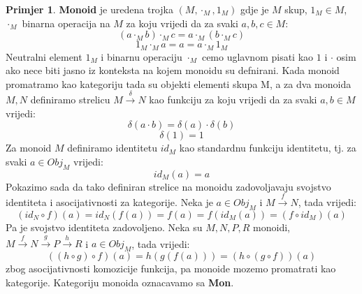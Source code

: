 \documentclass[11pt]{article}
\newcommand{\bold}[1]{\textbf{#1}}
\theoremstyle{definition}
\newtheorem{primjer}{Primjer}
\begin{document}
  \begin{primjer}
    \bold{Monoid} je uredena trojka $(M, \cdot_M, 1_M)$ gdje je $M$ skup, $1_M
    \in M$, $\cdot_M$ binarna operacija na $M$ za koju vrijedi da za svaki $a, b, c \in M$:
    \begin{equation*}
      (a \cdot_M b) \cdot_M c = a \cdot_M (b \cdot_M c)
    \end{equation*}
    \begin{equation*}
      1_M \cdot_M a = a = a \cdot_M 1_M
    \end{equation*}
    Neutralni element $1_M$ i binarnu operaciju $\cdot_M$ cemo uglavnom pisati
    kao $1$ i $\cdot$ osim ako nece biti jasno iz konteksta na kojem monoidu
    su defnirani.
    Kada monoid promatramo kao kategoriju tada su objekti elementi skupa M, a
    za dva monoida $M, N$ definiramo strelicu $M \xrightarrow{\delta} N$ kao
    funkciju za koju vrijedi da za svaki $a, b \in M$ vrijedi:
    \begin{equation*}
      \delta(a \cdot b) = \delta(a) \cdot \delta(b)
    \end{equation*}
    \begin{equation*}
      \delta(1) = 1
    \end{equation*}
    Za monoid $M$ definiramo identitetu $id_M$ kao standardnu funkciju
    identitetu, tj. za svaki $a \in Obj_M$ vrijedi:
    \begin{equation*}
      id_M(a) = a
    \end{equation*}
    Pokazimo sada da tako definiran strelice na monoidu zadovoljavaju
    svojstvo identiteta i asocijativnosti za kategorije.
    Neka je $a \in Obj_M$ i $M \xrightarrow{f} N$, tada vrijedi:
    \begin{equation*}
      (id_N \circ f)(a) = id_N(f(a)) = f(a) = f(id_M(a)) = (f \circ id_M)(a)
    \end{equation*}
    Pa je svojstvo identiteta zadovoljeno.
    Neka su $M, N, P, R$ monoidi, $M \xrightarrow{f} N \xrightarrow{g} P \xrightarrow{h} R$
    i $a \in Obj_M$, tada vrijedi:
    \begin{equation*}
      ((h \circ g) \circ f)(a) = h(g(f(a))) = (h \circ (g \circ f))(a)
    \end{equation*}
    zbog asocijativnosti komozicije funkcija, pa monoide mozemo promatrati kao
    kategorije. Kategoriju monoida oznacavamo sa \bold{Mon}.
  \end{primjer}
\end{document}

